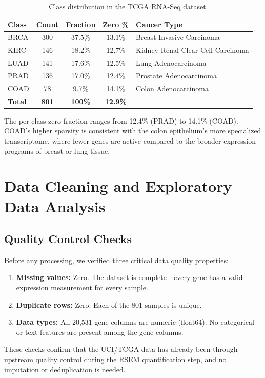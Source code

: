 \documentclass{article}
\begin{document}
\begin{table}[H]
\caption{Class distribution in the TCGA RNA-Seq dataset.}
\label{tab:classes}
\begin{center}
\begin{tabular}{lcccl}
\toprule
\textbf{Class} & \textbf{Count} & \textbf{Fraction} & \textbf{Zero \%} & \textbf{Cancer Type}\\
\midrule
BRCA & 300 & 37.5\% & 13.1\% & Breast Invasive Carcinoma\\
KIRC & 146 & 18.2\% & 12.7\% & Kidney Renal Clear Cell Carcinoma\\
LUAD & 141 & 17.6\% & 12.5\% & Lung Adenocarcinoma\\
PRAD & 136 & 17.0\% & 12.4\% & Prostate Adenocarcinoma\\
COAD & 78  & 9.7\%  & 14.1\% & Colon Adenocarcinoma\\
\midrule
\textbf{Total} & \textbf{801} & \textbf{100\%} & \textbf{12.9\%} &\\
\bottomrule
\end{tabular}
\end{center}
\end{table}

The per-class zero fraction ranges from 12.4\% (PRAD) to 14.1\% (COAD). COAD's higher sparsity is consistent with the colon epithelium's more specialized transcriptome, where fewer genes are active compared to the broader expression programs of breast or lung tissue.

\section{Data Cleaning and Exploratory Data Analysis}

\subsection{Quality Control Checks}
Before any processing, we verified three critical data quality properties:
\begin{enumerate}[leftmargin=2em]
\item \textbf{Missing values:} Zero. The dataset is complete---every gene has a valid expression measurement for every sample.
\item \textbf{Duplicate rows:} Zero. Each of the 801 samples is unique.
\item \textbf{Data types:} All 20{,}531 gene columns are numeric (float64). No categorical or text features are present among the gene columns.
\end{enumerate}
These checks confirm that the UCI/TCGA data has already been through upstream quality control during the RSEM quantification step, and no imputation or deduplication is needed.
\end{document}
